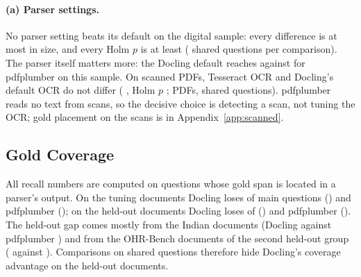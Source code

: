 \paragraph{(a) Parser settings.} No parser setting beats its default on
the digital sample: every difference is at most
\RQfiveADigitalMaxAbsDiff{} in size, and every Holm $p$ is at least
\RQfiveADigitalMinHolm{} (\RQfiveADigitalQuestions{} shared questions per
comparison). The parser itself matters more: the Docling default reaches
\RQfiveADigitalDoclingRecall{} against \RQfiveADigitalPdfplumberRecall{}
for pdfplumber on this sample. On scanned PDFs, Tesseract OCR and
Docling's default OCR do not differ (\RQfiveAScannedDiff{}
\RQfiveAScannedCI{}, Holm $p$ \RQfiveAScannedHolm{};
\RQfiveAScannedDocuments{} PDFs, \RQfiveAScannedQuestions{} shared
questions). pdfplumber reads no text from scans, so the decisive choice
is detecting a scan, not tuning the OCR; gold placement on the scans is
in Appendix~\ref{app:scanned}.

\subsection{Gold Coverage}
\label{sec:coverage}

All recall numbers are computed on questions whose gold span is located
in a parser's output. On the tuning documents Docling loses
\CoverageTuningDoclingLost{} of \CoverageTuningDoclingTotal{} main
questions (\CoverageTuningDoclingShare{}) and pdfplumber
\CoverageTuningPdfplumberLost{} (\CoverageTuningPdfplumberShare{}); on
the held-out documents Docling loses \CoverageHeldOutDoclingLost{} of
\CoverageHeldOutDoclingTotal{} (\CoverageHeldOutDoclingShare{}) and
pdfplumber \CoverageHeldOutPdfplumberLost{}
(\CoverageHeldOutPdfplumberShare{}). The held-out gap comes mostly from
the Indian documents (Docling \CoverageBySourceHeldOutIndianDocling{}
against pdfplumber \CoverageBySourceHeldOutIndianPdfplumber{}) and from
the OHR-Bench documents of the second held-out group
(\CoverageBySourceHeldOutCOHRBenchDocling{} against
\CoverageBySourceHeldOutCOHRBenchPdfplumber{}). Comparisons on shared
questions therefore hide Docling's coverage advantage on the held-out
documents.
